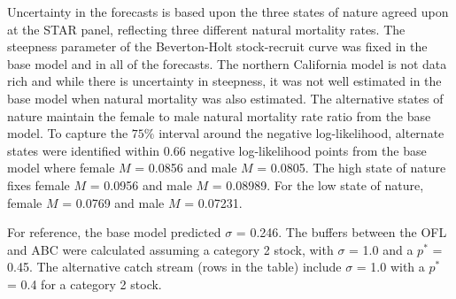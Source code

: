 \documentclass[11pt,
  english,
]{article}
\begin{document}
\leavevmode\tagmcend\tagstructend

\renewcommand{\thepage}{J\arabic{page}}
\renewcommand{\thefigure}{J\arabic{figure}}
\renewcommand{\thetable}{J\arabic{table}}
\setcounter{page}{1}
\setcounter{figure}{0}
\setcounter{table}{0}

Uncertainty in the forecasts is based upon the three states of nature agreed upon at the STAR panel, reflecting three different natural mortality rates. The steepness parameter of the Beverton-Holt stock-recruit curve was fixed in the base model and in all of the forecasts. The northern California model is not data rich and while there is uncertainty in steepness, it was not well estimated in the base model when natural mortality was also estimated. The alternative states of nature maintain the female to male natural mortality rate ratio from the base model. To capture the {\(75\%\)\leavevmode\tagmcend\tagstructend} interval around the negative log-likelihood, alternate states were identified within 0.66 negative log-likelihood points from the base model where female {\(M\)\leavevmode\tagmcend\tagstructend} = 0.0856 and male {\(M\)\leavevmode\tagmcend\tagstructend} = 0.0805. The high state of nature fixes female {\(M\)\leavevmode\tagmcend\tagstructend} = 0.0956 and male {\(M\)\leavevmode\tagmcend\tagstructend} = 0.08989. For the low state of nature, female {\(M\)\leavevmode\tagmcend\tagstructend} = 0.0769 and male {\(M\)\leavevmode\tagmcend\tagstructend} = 0.07231.

For reference, the base model predicted {\(\sigma\)\leavevmode\tagmcend\tagstructend} = 0.246. The buffers between the OFL and ABC were calculated assuming a category 2 stock, with {\(\sigma\)\leavevmode\tagmcend\tagstructend} = 1.0 and a {\(p^*\)\leavevmode\tagmcend\tagstructend} = 0.45. The alternative catch stream (rows in the table) include {\(\sigma\)\leavevmode\tagmcend\tagstructend} = 1.0 with a {\(p^*\)\leavevmode\tagmcend\tagstructend} = 0.4 for a category 2 stock.
\end{document}
